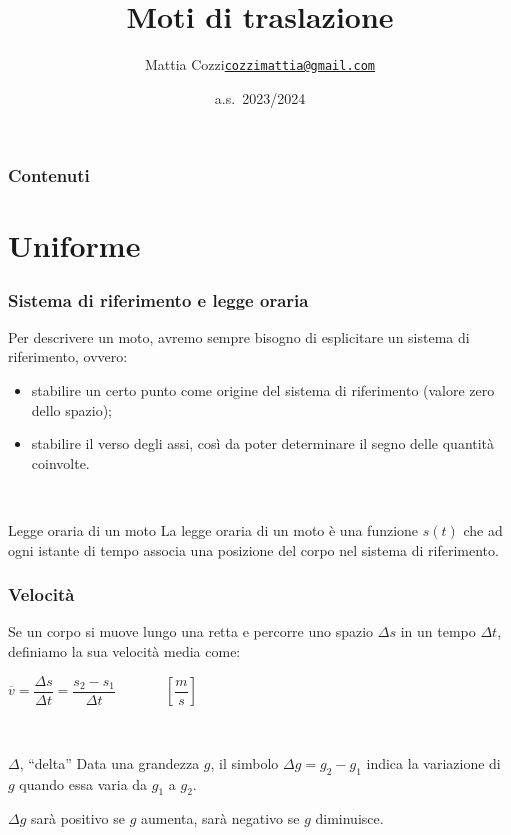 \documentclass[]{beamer}
\title{Moti di traslazione}
\author{\texorpdfstring{Mattia Cozzi\newline\href{mailto:cozzimattia@gmail.com}{\texttt{cozzimattia@gmail.com}}}{Mattia Cozzi}}
\date{a.s.~2023/2024}
\theoremstyle{plain}
\begin{document}
\begin{frame}
  \titlepage
\end{frame}





\begin{frame}
\frametitle{Contenuti}
\tableofcontents
\end{frame}






\section{Uniforme}

\begin{frame}
\frametitle{Sistema di riferimento e legge oraria}
Per descrivere un moto, avremo \alert<1>{sempre} bisogno di esplicitare un sistema di riferimento, ovvero:\pause
\begin{itemize}
  \item stabilire un certo punto come \alert<2>{origine del sistema di riferimento} (valore zero dello spazio);\pause
  \item stabilire il \alert<3>{verso degli assi}, così da poter determinare il segno delle quantità coinvolte.
\end{itemize}\pause

~

\begin{block}{Legge oraria di un moto}
La legge oraria di un moto è una funzione $ s(t) $ che ad ogni istante di tempo associa una posizione del corpo nel sistema di riferimento.
\end{block}
\end{frame}


\begin{frame}
\frametitle{Velocità}
Se un corpo si muove lungo una retta e percorre uno spazio $ \Delta s $ in un tempo $ \Delta t $, definiamo la sua \alert{velocità media} come:
\begin{center}
\colorbox{marroncino!30}{$ \overline{v} = \dfrac{\Delta s}{\Delta t} = \dfrac{s_{2} - s_1}{\Delta t} $}~~~~~~~$ \left[ \dfrac{m}{s} \right] $
\end{center}\pause

~

\begin{block}{$ \Delta $, ``delta''}
Data una grandezza $ g $, il simbolo $ \Delta g = g_2 - g_1 $ indica la
\alert{variazione} di $ g $ quando essa varia da $ g_1 $ a $ g_2 $.

$ \Delta g $ sarà positivo se $ g $ aumenta, sarà negativo se $ g $ diminuisce.
\end{block}
\end{frame}
\end{document}
